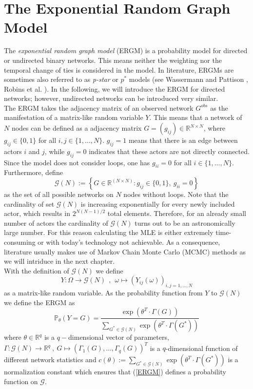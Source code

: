 \documentclass[10pt, conference, compsocconf]{IEEEtran}
\begin{document}
\section{The Exponential Random Graph Model}
\noindent The \textit{exponential random graph model} (ERGM) is a probability model for directed or undirected binary networks. This means neither the weighting nor the temporal change of ties is considered in the model.
In literature, ERGMs are sometimes also referred to as \textit{p-star} or $p^*$ models (see Wassermann and Pattison \cite{Wasserman.1996}, Robins et al. \cite{robins.pattison.2007}). In the following, we will introduce the ERGM for directed networks; however, undirected networks can be introduced very similar.\\[0.3cm] 
The ERGM takes the adjacency matrix of an observed network $G^{obs}$ as the manifestation of a matrix-like random variable $Y$. This means that a network of $N$ nodes can be defined as a adjacency matrix $G=(g_{ij})\in \mathbb{R}^{N \times N}$, where $g_{ij} \in \{0,1\}$ for all $i,j \in \{1,\dots , N\}$. $g_{ij}=1$ means that there is an edge between actors $i$ and $j$, while $g_{ij}=0$ indicates that these actors are not directly connected. Since the model does not consider loops, one has $g_{ii}=0$ for all $i \in \{1,\dots , N\}$. Furthermore, define
$$ \mathcal{G}(N) := \left\{ G \in \mathbb{R}^{(N \times N)}: g_{ij} \in \{0,1\},~g_{ii}=0\right\}$$
as the set of all possible networks on $N$ nodes without loops. Note that the cardinality of set $\mathcal{G}(N)$ is increasing exponentially for every newly included actor, which results in $2^{N(N-1)/2}$ total elements. Therefore, for an already small number of actors the cardinality of $\mathcal{G}(N)$ turns out to be an astronomically large number. For this reason calculating the MLE is either extremely time-consuming or with today's technology not achievable. As a consequence, literature usually makes use of Markov Chain Monte Carlo (MCMC) methods as we will intriduce in the next chapter.\\  
With the definition of $\mathcal{G}(N)$ we define 
$$Y: \Omega \to \mathcal{G}(N)~~,~~\omega \mapsto (Y_{ij}(\omega))_{i,j=1,\dots,N}$$
as a matrix-like random variable. As the probability function from $Y$ to $\mathcal{G}(N)$ we define the ERGM as
\begin{equation}
\mathbb{P}_{\theta}(Y=G)=\dfrac{\exp(\theta^T \cdot \Gamma(G))}{\sum_{G^* \in \mathcal{G}(N)} \exp(\theta^T \cdot \Gamma(G^*))} 
\label{ERGM}
\end{equation}
%
where $\theta \in \mathbb{R}^q$ is a $q-$dimensional vector of parameters, $\Gamma:\mathcal{G}(N) \to \mathbb{R}^q~,~G \mapsto (\Gamma_1(G),\dots,\Gamma_q(G))^T$ is a $q$-dimensional function of different network statistics and $c(\theta):= \sum_{G^* \in \mathcal{G}(N)} \exp(\theta^T \cdot \Gamma(G^*))$ is a normalization constant which ensures that (\ref{ERGM}) defines a probability function on $\mathcal{G}$.
\end{document}

